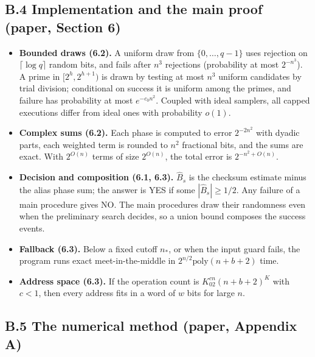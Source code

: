 \documentclass[10pt,a4paper]{article}
\begin{document}
\subsection*{B.4 Implementation and the main proof (paper, Section 6)}

\begin{itemize}
\item \textbf{Bounded draws (6.2).} A uniform draw from $\{0, \dots, q-1\}$ uses rejection on $\lceil\log q\rceil$ random bits, and
fails after $n^3$ rejections (probability at most $2^{-n^3}$). A prime in $[2^h, 2^{h+1})$ is drawn by testing at most
$n^3$ uniform candidates by trial division; conditional on success it is uniform among the primes, and failure has
probability at most $e^{-c_0n^2}$. Coupled with ideal samplers, all capped executions differ from ideal ones with
probability $o(1)$.
\item \textbf{Complex sums (6.2).} Each phase is computed to error $2^{-2n^2}$ with dyadic parts, each weighted term is rounded to
$n^2$ fractional bits, and the sums are exact. With $2^{O(n)}$ terms of size $2^{O(n)}$, the total error is
$2^{-n^2 + O(n)}$.
\item \textbf{Decision and composition (6.1, 6.3).} $\hat B_s$ is the checksum estimate minus the alias phase sum; the answer is
YES if some $|\hat B_s| \ge 1/2$. Any failure of a main procedure gives NO. The main procedures draw their randomness
even when the preliminary search decides, so a union bound composes the success events.
\item \textbf{Fallback (6.3).} Below a fixed cutoff $n_*$, or when the input guard fails, the program runs exact
meet-in-the-middle in $2^{n/2}\mathrm{poly}(n+b+2)$ time.
\item \textbf{Address space (6.3).} If the operation count is $K_02^{cn}(n+b+2)^K$ with $c < 1$, then every address fits in a
word of $w$ bits for large $n$.
\end{itemize}

\subsection*{B.5 The numerical method (paper, Appendix A)}
\end{document}
